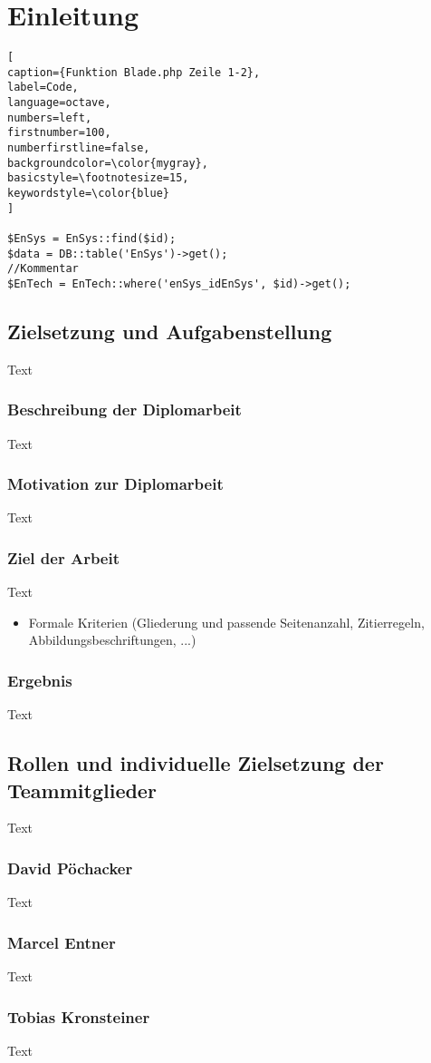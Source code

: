 \chapter{Einleitung}
\renewcommand{\lstlistingname}{Quellcode}

\begin{lstlisting}[
caption={Funktion Blade.php Zeile 1-2},
label=Code,
language=octave,
numbers=left,
firstnumber=100,
numberfirstline=false,
backgroundcolor=\color{mygray},
basicstyle=\footnotesize=15,
keywordstyle=\color{blue}
]

$EnSys = EnSys::find($id);
$data = DB::table('EnSys')->get();
//Kommentar
$EnTech = EnTech::where('enSys_idEnSys', $id)->get();
\end{lstlisting}


\section{Zielsetzung und Aufgabenstellung}
Text


\subsection{Beschreibung der Diplomarbeit}
Text

\subsection{Motivation zur Diplomarbeit}
Text


\subsection{Ziel der Arbeit}
Text

\begin{itemize}
 \item Formale Kriterien (Gliederung und passende Seitenanzahl, Zitierregeln, Abbildungsbeschriftungen, ...)
\end{itemize}

\subsection{Ergebnis}
Text

\section{Rollen und individuelle Zielsetzung der Teammitglieder}
Text

\subsection{David Pöchacker}
Text

\subsection{Marcel Entner}
Text

\subsection{Tobias Kronsteiner}
Text


